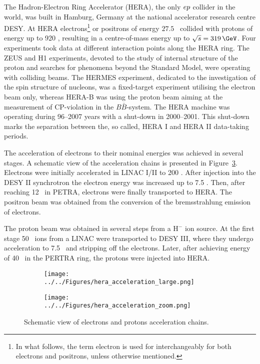 The Hadron-Electron Ring Accelerator (HERA), the only $\mbox{$e p$}$ collider in the world, was built in Hamburg, Germany at the national accelerator research centre DESY. At HERA electrons\footnote{In what follows, the term electron is used for interchangeably for both electrons and positrons, unless otherwise mentioned.} or positrons of energy $27.5$ \GeV\, collided with protons of energy up to 920 \GeV, resulting in a centre-of-mass energy up to $\sqs = 319\, \GeV$. Four experiments took data at different interaction points along the HERA ring. The ZEUS and H1 experiments, devoted to the study of internal structure of the proton and searches for phenomena beyond the Standard Model, were operating with colliding beams. The HERMES experiment, dedicated to the investigation of the spin structure of nucleons, was a fixed-target experiment utilising the electron beam only, whereas HERA-B was using the proton beam aiming at the measurement of CP-violation in the $B\bar{B}$-system. The HERA machine was operating during 96--2007 years with a shut-down in 2000--2001. This shut-down marks the separation between the, so called, HERA I and HERA II data-taking periods.

The acceleration of electrons to their nominal energies was achieved in several stages. A schematic view of the acceleration chains is presented in Figure~\ref{fig:hera_acceleration}. Electrons were initially accelerated in LINAC I/II to 200 \MeV. After injection into the DESY II synchrotron the electron energy was increased up to 7.5 \GeV. Then, after reaching 12 \GeV\, in PETRA, electrons were finally transported to HERA. The positron beam was obtained from the conversion of the bremsstrahlung emission of electrons. 

The proton beam was obtained in several steps from a $\text{H}^-$ ion source. At the first stage 50 \MeV\, ions from a LINAC were transported to DESY III, where they undergo acceleration to 7.5 \GeV\, and stripping off the electrons. Later, after achieving energy of 40 \GeV\, in the PERTRA ring, the protons were injected into HERA.

\begin{figure}
	\centering
	\begin{subfigure}{.49\textwidth}
		\centering
		\texttt{[image: ../../Figures/hera\_acceleration\_large.png]}
		\label{fig:hera_acceleration_large}
	\end{subfigure}
	\begin{subfigure}{.49\textwidth}
		\texttt{[image: ../../Figures/hera\_acceleration\_zoom.png]}
		\label{fig:hera_acceleration_zoom}
	\end{subfigure}
	\caption{Schematic view of electrons and protons acceleration chains.}
\label{fig:hera_acceleration}
\end{figure}


